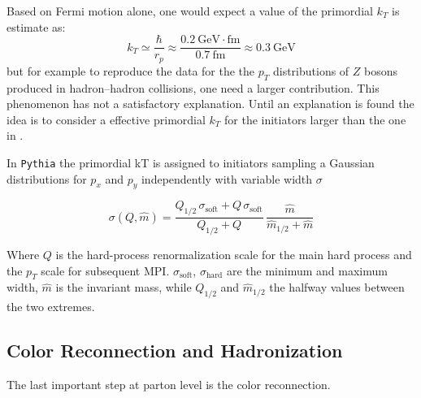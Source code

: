 \bigskip

Based on Fermi motion alone, one would expect a value of the primordial $k_T$ is estimate as: 
\begin{equation}
	k_T\simeq\frac{\hbar}{r_p}\approx\frac{0.2\ \mathrm{GeV\cdot fm}}{0.7\ \mathrm{fm}}\approx0.3\ \mathrm{GeV}
\label{eq:PrimordialKT}
\end{equation}
but for example to reproduce the data for the the $p_T$ distributions of $Z$ bosons produced in hadron–hadron collisions, one need a larger contribution. This phenomenon has not a satisfactory explanation. Until an explanation is found the idea is to consider a effective primordial $k_T$ for the initiators larger than the one in .

In \texttt{Pythia} the primordial kT is assigned to initiators sampling a Gaussian distributions for $p_x$ and $p_y$ independently with variable width $\sigma$

\begin{equation}
	\sigma(Q,\widehat{m})=\frac{Q_{1/2}\,\sigma_{\text{soft}}+Q\,\sigma_{\text{soft}}}{Q_{1/2}+Q}\,\frac{\widehat{m}}{\widehat{m}_{1/2}+\widehat{m}}
\end{equation}
 
Where $Q$ is the hard-process renormalization scale for the main hard process and the $p_T$ scale for subsequent MPI. $\sigma_{\text{soft}}$, $\sigma_{\text{hard}}$ are the minimum and maximum width, $\widehat{m}$ is the invariant mass, while $Q_{1/2}$ and $\widehat{m}_{1/2}$ the halfway values between the two extremes.

\subsection{Color Reconnection and Hadronization }

The last important step at parton level is the color reconnection.

